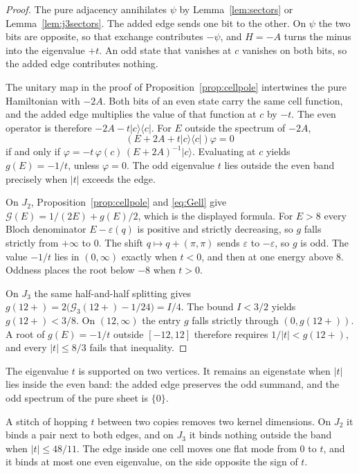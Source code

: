 \begin{proof}
The pure adjacency annihilates \(\psi\) by Lemma~\ref{lem:sectors} or
Lemma~\ref{lem:j3sectors}.
The added edge sends one bit to the other.
On \(\psi\) the two bits are opposite, so that exchange contributes \(-\psi\),
and \(H=-A\) turns the minus into the eigenvalue \(+t\).
An odd state that vanishes at \(c\) vanishes on both bits, so the added edge
contributes nothing.

The unitary map in the proof of Proposition~\ref{prop:cellpole} intertwines
the pure Hamiltonian with \(-2A\).
Both bits of an even state carry the same cell function, and the added edge
multiplies the value of that function at \(c\) by \(-t\).
The even operator is therefore \(-2A-t|c\rangle\langle c|\).
For \(E\) outside the spectrum of \(-2A\),
\[
(E+2A+t|c\rangle\langle c|)\varphi=0
\]
if and only if \(\varphi=-t\,\varphi(c)\,(E+2A)^{-1}|c\rangle\).
Evaluating at \(c\) yields \(g(E)=-1/t\), unless \(\varphi=0\).
The odd eigenvalue \(t\) lies outside the even band precisely when \(|t|\)
exceeds the edge.

On \(J_2\), Proposition~\ref{prop:cellpole} and \eqref{eq:Gell} give
\(\mathcal{G}(E)=1/(2E)+g(E)/2\), which is the displayed formula.
For \(E>8\) every Bloch denominator \(E-\varepsilon(q)\) is positive and
strictly decreasing, so \(g\) falls strictly from \(+\infty\) to \(0\).
The shift \(q\mapsto q+(\pi,\pi)\) sends \(\varepsilon\) to \(-\varepsilon\), so
\(g\) is odd.
The value \(-1/t\) lies in \((0,\infty)\) exactly when \(t<0\), and then at
one energy above \(8\).
Oddness places the root below \(-8\) when \(t>0\).

On \(J_3\) the same half-and-half splitting gives
\(g(12+)=2\bigl(\mathcal{G}_3(12+)-1/24\bigr)=I/4\).
The bound \(I<3/2\) yields \(g(12+)<3/8\).
On \((12,\infty)\) the entry \(g\) falls strictly through \((0,g(12+))\).
A root of \(g(E)=-1/t\) outside \([-12,12]\) therefore requires
\(1/|t|<g(12+)\), and every \(|t|\le 8/3\) fails that inequality.
\end{proof}

The eigenvalue \(t\) is supported on two vertices.
It remains an eigenstate when \(|t|\) lies inside the even band: the added
edge preserves the odd summand, and the odd spectrum of the pure sheet is
\(\{0\}\).

A stitch of hopping \(t\) between two copies removes two kernel dimensions.
On \(J_2\) it binds a pair next to both edges, and on \(J_3\) it binds nothing
outside the band when \(|t|\le 48/11\).
The edge inside one cell moves one flat mode from \(0\) to \(t\), and it
binds at most one even eigenvalue, on the side opposite the sign of \(t\).

